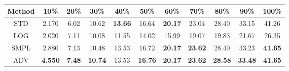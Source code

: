 \documentclass{standalone}
\begin{document}
\begin{tabular}{c|cccccccccc}
      \toprule
      Method & 10\% & 20\% & 30\% & 40\% & 50\% & 60\% & 70\% & 80\% & 90\% & 100\% \\
      \midrule
STD & 2.170 & 6.02 & 10.62 & \textbf{13.66} & 16.64 & \textbf{20.17} & 23.04 & 28.40 & 33.15 & 41.26\\
LOG & 2.020 & 7.11 & 10.08 & 11.55 & 14.02 & 15.99 & 19.07 & 19.83 & 21.67 & 26.35\\
SMPL & 2.880 & 7.13 & 10.48 & 13.53 & 16.72 & \textbf{20.17} & \textbf{23.62} & 28.40 & 33.23 & \textbf{41.65}\\
ADV & \textbf{4.550} & \textbf{7.48} & \textbf{10.74} & 13.53 & \textbf{16.76} & \textbf{20.17} & \textbf{23.62} & \textbf{28.58} & \textbf{33.48} & \textbf{41.65}\\
  \bottomrule
\end{tabular}
\end{document}
